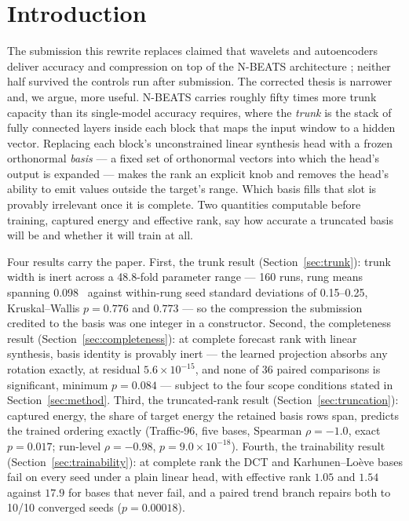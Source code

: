 \section{Introduction}\label{sec:intro}

The submission this rewrite replaces claimed that wavelets and autoencoders deliver accuracy and
compression on top of the N-BEATS architecture \citep{oreshkin2020nbeats}; neither half survived
the controls run after submission. The corrected thesis is narrower and, we argue, more useful.
N-BEATS carries roughly fifty times more trunk capacity than its single-model accuracy requires,
where the \emph{trunk} is the stack of fully connected layers inside each block that maps the
input window to a hidden vector. Replacing each block's unconstrained linear synthesis head with
a frozen orthonormal \emph{basis} --- a fixed set of orthonormal vectors into which the head's
output is expanded --- makes the rank an explicit knob and removes the head's ability to emit
values outside the target's range. Which basis fills that slot is provably irrelevant once it is
complete. Two quantities computable before training, captured energy and effective rank, say how
accurate a truncated basis will be and whether it will train at all.

Four results carry the paper. First, the trunk result (Section~\ref{sec:trunk}): trunk width is
inert across a 48.8-fold parameter range --- 160 runs, rung means spanning 0.098~\smape{}
against within-rung seed standard deviations of 0.15--0.25, Kruskal--Wallis $p = 0.776$ and
$0.773$ --- so the compression the submission credited to the basis was one integer in a
constructor. Second, the completeness result (Section~\ref{sec:completeness}): at complete
forecast rank with linear synthesis, basis identity is provably inert --- the learned projection
absorbs any rotation exactly, at residual $5.6 \times 10^{-15}$, and none of 36 paired
comparisons is significant, minimum $p = 0.084$ --- subject to the four scope conditions stated
in Section~\ref{sec:method}. Third, the truncated-rank result (Section~\ref{sec:truncation}):
captured energy, the share of target energy the retained basis rows span, predicts the trained
ordering exactly (Traffic-96, five bases, Spearman $\rho = -1.0$, exact $p = 0.017$; run-level
$\rho = -0.98$, $p = 9.0 \times 10^{-18}$). Fourth, the trainability result
(Section~\ref{sec:trainability}): at complete rank the DCT and Karhunen--Lo\`eve bases fail on
every seed under a plain linear head, with effective rank $1.05$ and $1.54$ against $17.9$ for
bases that never fail, and a paired trend branch repairs both to 10/10 converged seeds
($p = 0.00018$).

